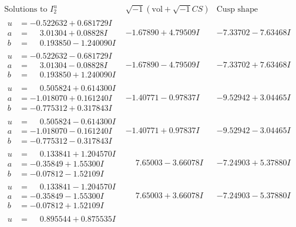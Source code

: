 \documentclass[1p]{elsarticle_modified}
\theoremstyle{definition}
\newcommand{\I}{\sqrt{-1}}
\begin{document}
$$\begin{array}{c|c|c}  
\text{Solutions to }I^u_{2}& \I (\text{vol} + \sqrt{-1}CS) & \text{Cusp shape}\\
 \hline 
\begin{aligned}
u &= -0.522632 + 0.681729 I \\
a &= \phantom{-}3.01304 + 0.08828 I \\
b &= \phantom{-}0.193850 - 1.240090 I\end{aligned}
 & -1.67890 + 4.79509 I & -7.33702 - 7.63468 I \\ \hline\begin{aligned}
u &= -0.522632 - 0.681729 I \\
a &= \phantom{-}3.01304 - 0.08828 I \\
b &= \phantom{-}0.193850 + 1.240090 I\end{aligned}
 & -1.67890 - 4.79509 I & -7.33702 + 7.63468 I \\ \hline\begin{aligned}
u &= \phantom{-}0.505824 + 0.614300 I \\
a &= -1.018070 + 0.161240 I \\
b &= -0.775312 + 0.317843 I\end{aligned}
 & -1.40771 - 0.97837 I & -9.52942 + 3.04465 I \\ \hline\begin{aligned}
u &= \phantom{-}0.505824 - 0.614300 I \\
a &= -1.018070 - 0.161240 I \\
b &= -0.775312 - 0.317843 I\end{aligned}
 & -1.40771 + 0.97837 I & -9.52942 - 3.04465 I \\ \hline\begin{aligned}
u &= \phantom{-}0.133841 + 1.204570 I \\
a &= -0.35849 + 1.55300 I \\
b &= -0.07812 - 1.52109 I\end{aligned}
 & \phantom{-}7.65003 - 3.66078 I & -7.24903 + 5.37880 I \\ \hline\begin{aligned}
u &= \phantom{-}0.133841 - 1.204570 I \\
a &= -0.35849 - 1.55300 I \\
b &= -0.07812 + 1.52109 I\end{aligned}
 & \phantom{-}7.65003 + 3.66078 I & -7.24903 - 5.37880 I \\ \hline\begin{aligned}
u &= \phantom{-}0.895544 + 0.875535 I \\

\end{aligned}
\end{array}$$
\end{document}
